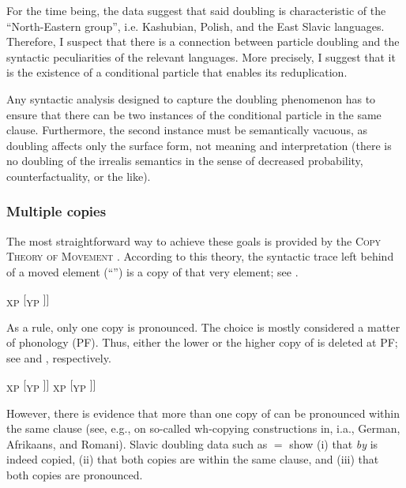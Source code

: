 \documentclass[output=paper]{langscibook}
\begin{document}
For the time being, the data suggest that said doubling is characteristic of the ``North-Eastern group'', i.e. Kashubian, Polish, and the East Slavic languages. Therefore, I suspect that there is a connection between particle doubling and the syntactic peculiarities of the relevant languages. More precisely, I suggest that it is the existence of a conditional particle that enables its reduplication.

Any syntactic analysis designed to capture the doubling phenomenon has to ensure that there can be two instances of the conditional particle in the same clause. Furthermore, the second instance must be semantically vacuous, as doubling affects only the surface form, not meaning and interpretation (there is no doubling of the irrealis semantics in the sense of decreased probability, counterfactuality, or the like). 


\subsubsection{Multiple copies}

The most straightforward way to achieve these goals is provided by the \textsc{Copy Theory of Movement} \citep[see, a.o.,][]{Chomsky1993,Nunes1995,CorverNunes2007}. According to this theory, the syntactic trace left behind of a moved element (``\textalpha'') is a copy of that very element; see .

\ea {[}\textsubscript{XP} {\textalpha} [\textsubscript{YP} {\textalpha} ]] 
\label{pitsch:ex:copy}
\z 

\noindent As a rule, only one copy is pronounced. The choice is mostly considered a matter of phonology (PF). Thus, either the lower or the higher copy of {\textalpha} is deleted at PF; see  and , respectively.

\ea
\ea {[}\textsubscript{XP} {\textalpha} [\textsubscript{YP} \sout{\textalpha} ]] \label{pitsch:ex:copy_2.1}
\ex {[}\textsubscript{XP} \sout{\textalpha} [\textsubscript{YP} {\textalpha} ]] \label{pitsch:ex:copy_2.2}
\z
\z 

\noindent However, there is evidence that more than one copy of {\textalpha} can be pronounced within the same clause (see, e.g., \citealt{BoskovicNunes2007} on so-called wh-copying constructions in, i.a., German, Afrikaans, and Romani). Slavic doubling data such as  $=$  show (i) that \textit{by} is indeed copied, (ii) that both copies are within the same clause, and (iii) that both copies are pronounced. 
\end{document}
